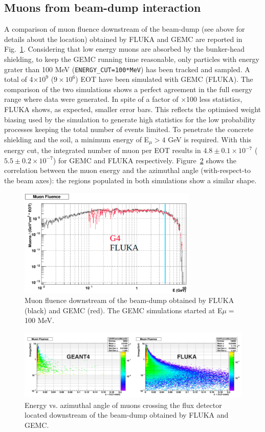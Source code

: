 \subsection{Muons from beam-dump interaction}
A comparison of muon fluence downstream of the beam-dump (see above for details about the location)
obtained by FLUKA and GEMC are reported in Fig.~\ref{fig:mu-flu-bd}. Considering that low energy muons are absorbed by the bunker-head shielding, to keep the GEMC running time reasonable, only particles with energy grater than 100 MeV ({\tt ENERGY\_CUT=100*MeV}) has been tracked and sampled. A total of 4$\times10^9$ ($9\times 10^6$) EOT have been simulated with GEMC (FLUKA). The comparison of the two simulations shows a perfect agreement in the full energy range where data were generated.
In spite of a factor of $\times$100  less statistics, FLUKA shows, as expected, smaller error bars. This reflects the optimised weight biasing used by the simulation to generate high statistics for the low probability processes keeping the total number of events limited.
To penetrate  the concrete shielding and the soil, a minimum energy of  E$_\mu>4$ GeV is required. With this energy cut,   the integrated number of muon per EOT results in $4.8\pm 0.1 \times 10^{-7}$ ($5.5\pm 0.2 \times 10^{-7}$) for GEMC and FLUKA respectively.
Figure~\ref{fig:mu-flu-bd-2d} shows the correlation between the muon energy and the azimuthal angle (with-respect-to the beam axes): the regions  populated in both simulations show a similar shape.

\begin{figure}[h!] 
\center
\includegraphics[width=8.5cm]{figs/mu-flu-bd.pdf}
\caption{Muon fluence downstream of the beam-dump obtained by FLUKA (black) and GEMC (red). The GEMC simulations started at E$\mu=$100 MeV.}
\label{fig:mu-flu-bd}
\end{figure}

\begin{figure}[h!] 
\center
\includegraphics[width=16cm]{figs/mu-flu-bd-2d.pdf} 
\caption{Energy vs. azimuthal angle of muons crossing the flux detector located downstream of the beam-dump obtained by FLUKA  and GEMC.}
\label{fig:mu-flu-bd-2d}
\end{figure}


